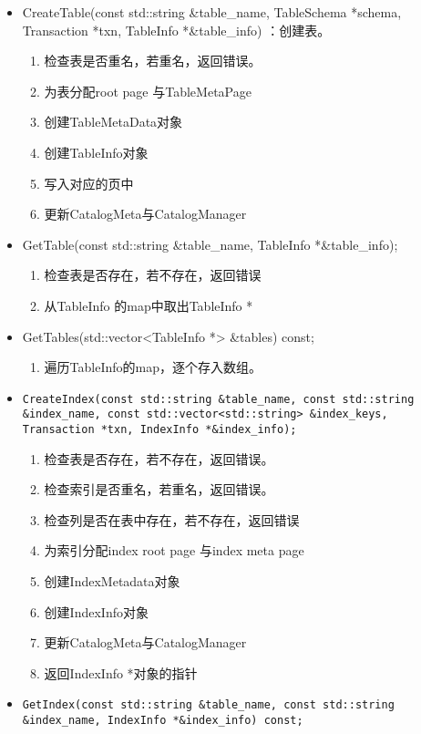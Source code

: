 \documentclass[12pt, a4paper]{article}
\def\c#1{\texttt{#1}}
\begin{document}
\begin{itemize}
  \item CreateTable(const std::string \&table\_name, TableSchema *schema, Transaction *txn, TableInfo *\&table\_info) ：创建表。\begin{enumerate}
    \item 检查表是否重名，若重名，返回错误。
    \item 为表分配root page 与TableMetaPage
    \item 创建TableMetaData对象
    \item 创建TableInfo对象
    \item 写入对应的页中
    \item 更新CatalogMeta与CatalogManager
  \end{enumerate}
  \item GetTable(const std::string \&table\_name, TableInfo *\&table\_info);\begin{enumerate}
    \item 检查表是否存在，若不存在，返回错误
    \item 从TableInfo 的map中取出TableInfo *
  \end{enumerate}
  \item GetTables(std::vector<TableInfo *> \&tables) const;\begin{enumerate}
    \item 遍历TableInfo的map，逐个存入数组。
  \end{enumerate}
  \item \c{CreateIndex(const std::string \&table\_name, const std::string \&index\_name,
  const std::vector<std::string> \&index\_keys, Transaction *txn, IndexInfo *\&index\_info);}\begin{enumerate}
    \item 检查表是否存在，若不存在，返回错误。
    \item 检查索引是否重名，若重名，返回错误。
    \item 检查列是否在表中存在，若不存在，返回错误
    \item 为索引分配index root page 与index meta page
    \item 创建IndexMetadata对象
    \item 创建IndexInfo对象
    \item 更新CatalogMeta与CatalogManager
    \item 返回IndexInfo *对象的指针
  \end{enumerate}
  \item \c{GetIndex(const std::string \&table\_name, const std::string \&index\_name, IndexInfo *\&index\_info) const;
}
\end{itemize}
\end{document}
